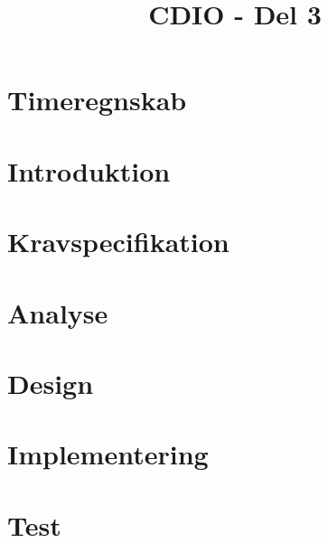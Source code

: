 \documentclass[12pt,oneside,a4paper,english]{article}
\title{CDIO - Del 3} %
\begin{document}


\newpage

\thispagestyle{fancy}

\newpage
\doublespacing
\renewcommand{\baselinestretch}{1}\normalsize
\tableofcontents
\renewcommand{\baselinestretch}{1}\normalsize
\thispagestyle{fancy} %



\newpage
\section{Timeregnskab}

\thispagestyle{fancy}



\newpage
\section{Introduktion}

\thispagestyle{fancy}

\newpage
\section{Kravspecifikation}

\thispagestyle{fancy}

\newpage
\section{Analyse}

\thispagestyle{fancy}

\newpage
\section{Design}

\thispagestyle{fancy}

\newpage
\section{Implementering}

\thispagestyle{fancy}

\newpage
\section{Test}

\thispagestyle{fancy}
\end{document}
